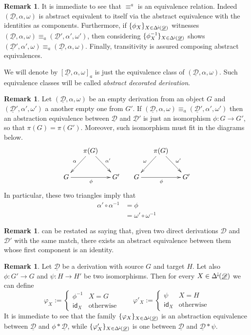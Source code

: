 \documentclass[a4paper]{article}
\newcommand{\Deltamin}{\Delta^{\hspace{-1pt}\downarrow\hspace{-1pt}}}
\newcommand{\id}[1]{\mathsf{id}_{#1}}
\newcommand{\dder}[1]{\mathscr{#1}}
\newcommand{\der}[1]{\underline{\dder{#1}}}
\theoremstyle{definition}
\newtheorem{remark}[theorem]{Remark}
\begin{document}
\begin{remark}\label{rem:equi}
	It is immediate to see that $\equiv^a$ is an equivalence relation. Indeed $(\der{D}, \alpha, \omega)$ is abstract equivalent to itself via the abstract equivalence with the identities as components. Furthermore, if  $\{\phi_X\}_{X\in \Deltamin(\der{D})}$  witnesses $(\der{D}, \alpha, \omega)\equiv_a (\der{D}', \alpha', \omega')$, then considering $\{\phi^{-1}_X\}_{X\in \Deltamin(\der{D})}$ shows $(\der{D}', \alpha', \omega)\equiv_a (\der{D}, \alpha, \omega)$. Finally, transitivity is assured composing abstract equivalences. 
	
	We will denote by $[\der{D}, \alpha, \omega]_a$ is just the equivalence class of  $(\der{D}, \alpha, \omega)$.
	 Such equivalence classes will be called  \emph{abstract decorated derivation}.  
\end{remark}

\begin{remark}\label{rem:empty}
Let $(\der{D},\alpha, \omega)$ be an empty derivation from an object $G$ and  $(\der{D}',\alpha', \omega')$ a another empty one from $G'$.  If $(\der{D},\alpha, \omega)\equiv_a(\der{D}',\alpha', \omega')$ then an abstraction equivalence between $\der{D}$ and $\der{D}'$ is just an isomorphism $\phi\colon G\to G'$, so that $\pi(G)=\pi(G')$. Moreover, such isomorphism must fit in the diagrams below.
\[\xymatrix@C=15pt{&\pi(G) \ar[dr]^{\alpha'} \ar[dl]_{\alpha}&&& \pi(G) \ar[dr]^{\omega'} \ar[dl]_{\omega}\\ G\ar[rr]_{\phi} && G' &G \ar[rr]_{\phi} && G' } \]
In particular, these two triangles imply that
\begin{align*}
	\alpha'\circ \alpha^{-1}&=\phi \\&=\omega'\circ \omega^{-1}
\end{align*}
\end{remark}

\begin{remark}\label{rem:res}  can be restated as saying that, given two direct derivations $\dder{D}$ and $\dder{D'}$ with the same match, there exists an abstract equivalence between them whose first component is an identity.
\end{remark}

\begin{remark}\label{rem:absequi}
	Let $\der{D}$ be a derivation with source $G$ and target $H$. Let also $\phi\colon G'\to G$ and $\psi\colon H\to H'$ be two isomorphisms. Then for every $X\in \Deltamin(\der{D})$ we can define 
	\[\varphi_X:=\begin{cases}
		\phi^{-1} & X=G\\
		\id{X} & \text{otherwise}
	\end{cases} \qquad \varphi'_X:=\begin{cases}
	\psi & X=H\\
	\id{X} & \text{otherwise}
	\end{cases}\]
It is immediate to see that the family $\{\varphi_X\}_{X\in \Deltamin(\der{D})}$ is an abstraction equivalence between $\der{D}$ and $\phi *\der{D}$, while $\{\varphi'_X\}_{X\in \Deltamin(\der{D})}$ is one between $\der{D}$ and $\der{D}*\psi$.
\end{remark}
\end{document}
